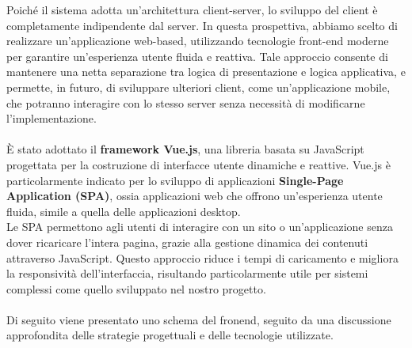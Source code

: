 Poiché il sistema adotta un’architettura client-server, lo sviluppo del client è completamente indipendente dal server.
In questa prospettiva, abbiamo scelto di realizzare un’applicazione web-based, utilizzando tecnologie front-end moderne per garantire un’esperienza utente fluida e reattiva.
Tale approccio consente di mantenere una netta separazione tra logica di presentazione e logica applicativa, e permette, in futuro, di sviluppare ulteriori client, come un’applicazione mobile, che potranno interagire con lo stesso server senza necessità di modificarne l’implementazione.
\\ \\
È stato adottato il \textbf{framework Vue.js}, una libreria basata su JavaScript progettata per la costruzione di interfacce utente dinamiche e reattive. Vue.js è particolarmente
indicato per lo sviluppo di applicazioni \textbf{Single-Page Application (SPA)}, ossia applicazioni web che offrono un’esperienza utente fluida, simile a quella delle applicazioni desktop. \\
Le SPA permettono agli utenti di interagire con un sito o un’applicazione senza dover ricaricare l’intera pagina, grazie alla gestione dinamica dei contenuti attraverso JavaScript. Questo
approccio riduce i tempi di caricamento e migliora la responsività dell’interfaccia, risultando
particolarmente utile per sistemi complessi come quello sviluppato nel nostro progetto.
\\ \\

Di seguito viene presentato uno schema del fronend, seguito da una discussione approfondita delle strategie progettuali e delle tecnologie utilizzate.

